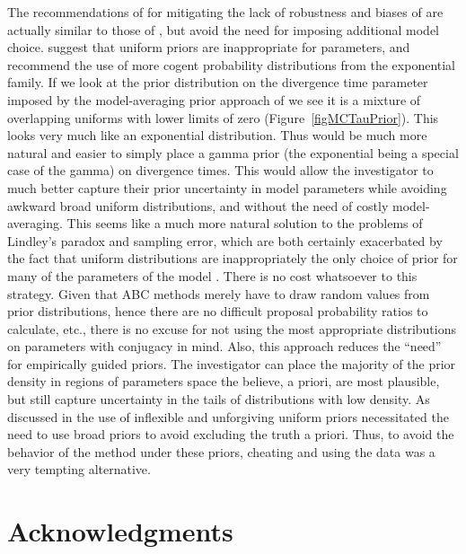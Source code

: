 \documentclass[letterpaper,12pt]{article}
\begin{document}
\begin{linenumbers}
The recommendations of \citet{Oaks2012} for mitigating the lack of robustness
and biases of \msb are actually similar to those of \citet{Hickerson2013},
but avoid the need for imposing additional model choice.
\citet{Oaks2012} suggest that uniform priors are inappropriate for parameters,
and recommend the use of more cogent probability distributions from the
exponential family.
If we look at the prior distribution on the divergence time parameter \divt{}
imposed by the model-averaging prior approach of \citet{Hickerson2013} we see
it is a mixture of overlapping uniforms with lower limits of zero
(Figure~\ref{figMCTauPrior}).
This looks very much like an exponential distribution.
Thus would be much more natural and easier to simply place a gamma prior (the
exponential being a special case of the gamma) on divergence times.
This would allow the investigator to much better capture their prior
uncertainty in model parameters while avoiding awkward broad uniform
distributions, and without the need of costly model-averaging.
This seems like a much more natural solution to the problems of Lindley's
paradox and sampling error, which are both certainly exacerbated by the fact
that uniform distributions are inappropriately the only choice of prior for
many of the parameters of the \msb model \citep[\divt{}, \ancestralTheta{},
, , \bottleTime{},
, , \locusMutationRateScalar,
\migrationRate{}, \recombinationRate;][]{Oaks2012}.
There is no cost whatsoever to this strategy.
Given that ABC methods merely have to draw random values from prior
distributions, hence there are no difficult proposal probability ratios to
calculate, etc., there is no excuse for not using the most appropriate
distributions on parameters with conjugacy in mind.
Also, this approach reduces the ``need'' for empirically guided priors.
The investigator can place the majority of the prior density in regions
of parameters space the believe, a priori, are most plausible, but still
capture uncertainty in the tails of distributions with low density.
As discussed in \citet{Oaks2012} the use of inflexible and unforgiving uniform
priors necessitated the need to use broad priors to avoid excluding the truth a
priori.
Thus, to avoid the   behavior of the method under these priors, cheating
and using the data was a very tempting alternative.


\section*{Acknowledgments}

% 


\newpage
\singlespacing

\renewcommand\listfigurename{Figure Captions}
\renewcommand\cftdotsep{\cftnodots}
\setlength\cftbeforefigskip{10pt}
\listoffigures


\end{linenumbers}
\end{document}
